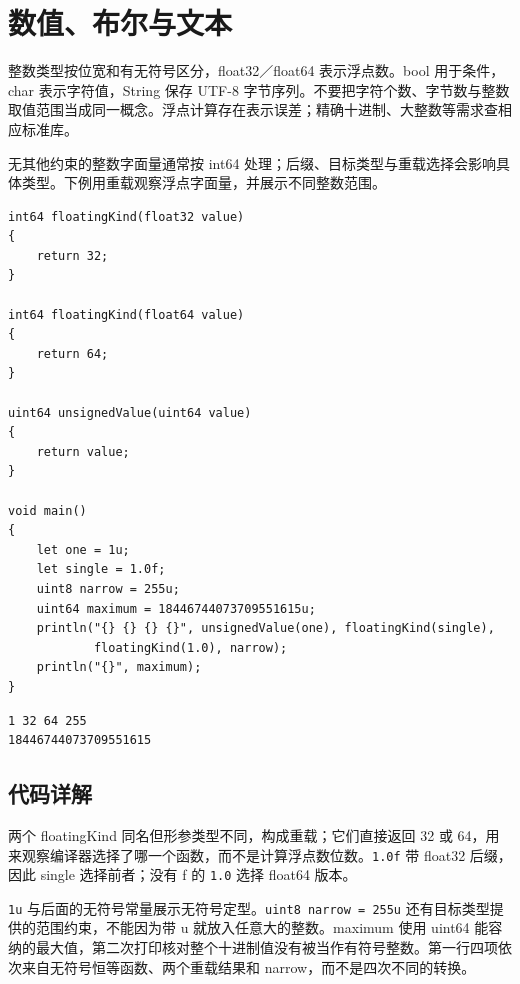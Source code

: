 \section{数值、布尔与文本}

整数类型按位宽和有无符号区分，float32／float64 表示浮点数。bool 用于条件，char 表示字符值，String 保存 UTF-8 字节序列。不要把字符个数、字节数与整数取值范围当成同一概念。浮点计算存在表示误差；精确十进制、大整数等需求查相应标准库。

无其他约束的整数字面量通常按 int64 处理；后缀、目标类型与重载选择会影响具体类型。下例用重载观察浮点字面量，并展示不同整数范围。

\par
\medskip
\begin{lstlisting}[style=chali]
int64 floatingKind(float32 value)
{
    return 32;
}

int64 floatingKind(float64 value)
{
    return 64;
}

uint64 unsignedValue(uint64 value)
{
    return value;
}

void main()
{
    let one = 1u;
    let single = 1.0f;
    uint8 narrow = 255u;
    uint64 maximum = 18446744073709551615u;
    println("{} {} {} {}", unsignedValue(one), floatingKind(single),
            floatingKind(1.0), narrow);
    println("{}", maximum);
}
\end{lstlisting}
\par
\medskip

\par
\medskip
\begin{lstlisting}[style=out]
1 32 64 255
18446744073709551615
\end{lstlisting}
\par
\medskip

\subsection*{代码详解}

两个 floatingKind 同名但形参类型不同，构成重载；它们直接返回 32 或 64，用来观察编译器选择了哪一个函数，而不是计算浮点数位数。\texttt{1.\allowbreak{}0f} 带 float32 后缀，因此 single 选择前者；没有 f 的 \texttt{1.\allowbreak{}0} 选择 float64 版本。

\texttt{1u} 与后面的无符号常量展示无符号定型。\texttt{uint8 narrow =\allowbreak{} 255u} 还有目标类型提供的范围约束，不能因为带 u 就放入任意大的整数。maximum 使用 uint64 能容纳的最大值，第二次打印核对整个十进制值没有被当作有符号整数。第一行四项依次来自无符号恒等函数、两个重载结果和 narrow，而不是四次不同的转换。

